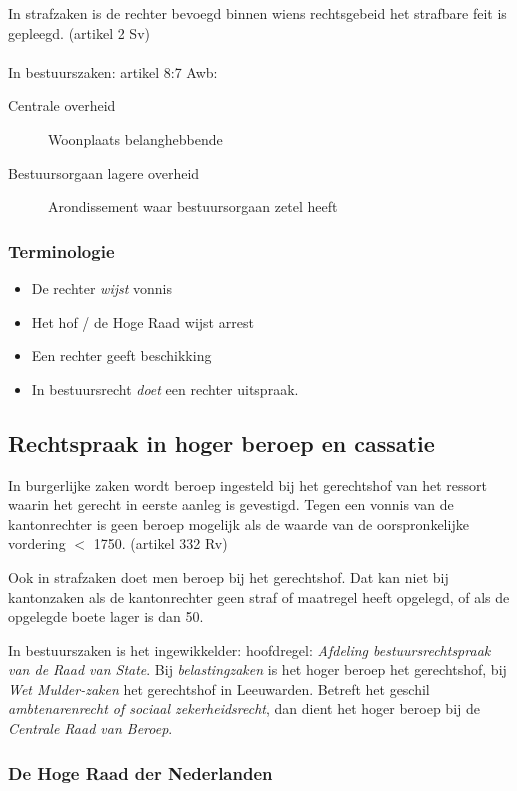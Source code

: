 \documentclass{article}
\begin{document}
In strafzaken is de rechter bevoegd binnen wiens rechtsgebeid het strafbare
feit is gepleegd. (artikel 2 Sv)
\\\\
In bestuurszaken: artikel 8:7 Awb:
\begin{description}
  \item[Centrale overheid] Woonplaats belanghebbende
  \item[Bestuursorgaan lagere overheid] Arondissement waar bestuursorgaan zetel heeft
\end{description}

\subsubsection{Terminologie}
\begin{itemize}
  \item De rechter \emph{wijst} vonnis
  \item Het hof / de Hoge Raad wijst arrest
  \item Een rechter geeft beschikking
  \item In bestuursrecht \emph{doet} een rechter uitspraak.
\end{itemize}

\subsection{Rechtspraak in hoger beroep en cassatie}

In burgerlijke zaken wordt beroep ingesteld bij het gerechtshof van het
ressort waarin het gerecht in eerste aanleg is gevestigd. Tegen een vonnis
van de kantonrechter is geen beroep mogelijk als de waarde van de oorspronkelijke
vordering $<$ 1750. (artikel 332 Rv)

Ook in strafzaken doet men beroep bij het gerechtshof. Dat kan niet bij
kantonzaken als de kantonrechter geen straf of maatregel heeft opgelegd, of als
de opgelegde boete lager is dan 50.

In bestuurszaken is het ingewikkelder: hoofdregel: \emph{Afdeling bestuursrechtspraak
van de Raad van State}. Bij \emph{belastingzaken} is het hoger beroep het gerechtshof,
bij \emph{Wet Mulder-zaken} het gerechtshof in Leeuwarden. Betreft het geschil
\emph{ambtenarenrecht of sociaal zekerheidsrecht}, dan dient het hoger beroep bij de
\emph{Centrale Raad van Beroep}.

\subsubsection{De Hoge Raad der Nederlanden}
\end{document}
